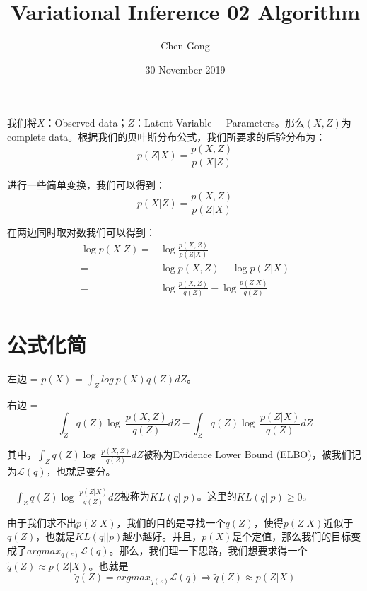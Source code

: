 \documentclass[a4paper]{article}
\title{Variational Inference 02 Algorithm}
\author{Chen Gong}
\date{30 November 2019}
\begin{document}
\maketitle
我们将$X$：Observed data；$Z$：Latent Variable + Parameters。那么$(X,Z)$为complete data。根据我们的贝叶斯分布公式，我们所要求的后验分布为：
\begin{equation}
    p(Z|X) = \frac{p(X,Z)}{p(X|Z)}
\end{equation}

进行一些简单变换，我们可以得到：
\begin{equation}
    p(X|Z) = \frac{p(X,Z)}{p(Z|X)}
\end{equation}

在两边同时取对数我们可以得到：
\begin{equation}
    \begin{split}
        \log p(X|Z) = & \log \frac{p(X,Z)}{p(Z|X)} \\
        = & \log p(X,Z) - \log p(Z|X) \\
        = & \log\frac{p(X,Z)}{q(Z)} - \log \frac{p(Z|X)}{q(Z)} \\
    \end{split}
\end{equation}

\section{公式化简}
左边 = $p(X)$ = $\int_{Z}log\ p(X)q(Z)dZ$。

右边 = 
\begin{equation}
    \int_Z q(Z)\log\ \frac{p(X,Z)}{q(Z)}dZ - \int_Z q(Z)\log\ \frac{p(Z|X)}{q(Z)}dZ
\end{equation}

其中，$\int_Z q(Z)\log\ \frac{p(X,Z)}{q(Z)}dZ$被称为Evidence Lower Bound (ELBO)，被我们记为$\mathcal{L}(q)$，也就是变分。

$- \int_Z q(Z)\log\ \frac{p(Z|X)}{q(Z)}dZ$被称为$KL(q||p)$。这里的$KL(q||p) \geq 0$。

由于我们求不出$p(Z|X)$，我们的目的是寻找一个$q(Z)$，使得$p(Z|X)$近似于$q(Z)$，也就是$KL(q||p)$越小越好。并且，$p(X)$是个定值，那么我们的目标变成了$argmax_{q(z)}\mathcal{L}(q)$。那么，我们理一下思路，我们想要求得一个$\widetilde{q}(Z) \approx p(Z|X)$。也就是
\begin{equation}
    \widetilde{q}(Z) = argmax_{q(z)} \mathcal{L}(q) \Rightarrow \widetilde{q}(Z) \approx p(Z|X)
\end{equation}
\end{document}
